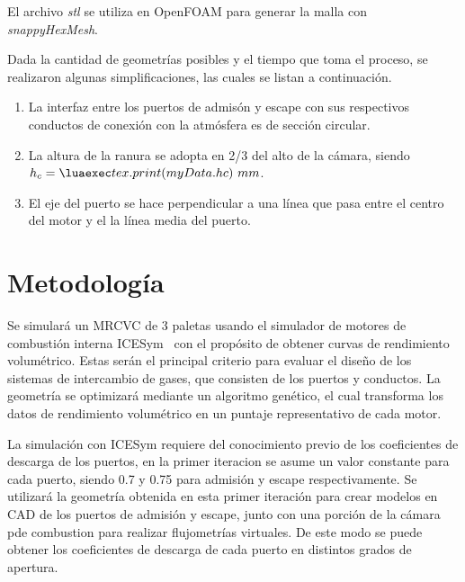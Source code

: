 %
El archivo \emph{stl} se utiliza en OpenFOAM para generar la malla con
\emph{snappyHexMesh}.

Dada la cantidad de geometrías posibles y el tiempo que toma el proceso, se
realizaron algunas simplificaciones, las cuales se listan a continuación.

%
\begin{enumerate}

    \item La interfaz entre los puertos de admisón y escape con sus respectivos
        conductos de conexión con la atmósfera es de sección circular.
    \item La altura de la ranura se adopta en 2/3 del alto de la cámara, siendo
        $h_c=\lua{tex.print(myData.hc)}\ mm$.
    \item El eje del puerto se hace perpendicular a una línea que pasa entre el
        centro del motor y el la línea media del puerto.

\end{enumerate}


\section{Metodología}
%
Se simulará un MRCVC de 3 paletas usando el simulador de motores de combustión
interna ICESym~\cite{icesym} con el propósito de obtener curvas de rendimiento
volumétrico.
%
Estas serán el principal criterio para evaluar el diseño de los sistemas de
intercambio de gases, que consisten de los puertos y conductos.
%
La geometría se optimizará mediante un algoritmo genético, el cual transforma
los datos de rendimiento volumétrico en un puntaje representativo de cada
motor.


La simulación con ICESym requiere del conocimiento previo de los coeficientes
de descarga de los puertos, en la primer iteracion se asume un valor constante
para cada puerto, siendo 0.7 y 0.75 para admisión y escape respectivamente.
%
Se utilizará la geometría obtenida en esta primer iteración para crear modelos
en CAD de los puertos de admisión y escape, junto con una porción de la cámara
pde combustion para realizar flujometrías virtuales.
%
De este modo se puede obtener los coeficientes de descarga de cada puerto en
distintos grados de apertura.

